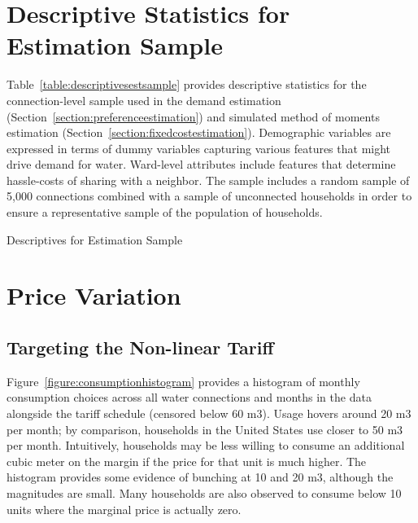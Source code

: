 \documentclass[12pt]{article}
\begin{document}
\begin{appendices}
\section{Descriptive Statistics for Estimation Sample}\label{appendix:descriptivesest}

Table~\ref{table:descriptivesestsample} provides descriptive statistics for the connection-level sample used in the demand estimation (Section~\ref{section:preferenceestimation}) and simulated method of moments estimation (Section~\ref{section:fixedcostestimation}).  Demographic variables are expressed in terms of dummy variables capturing various features that might drive demand for water.  Ward-level attributes include features that determine hassle-costs of sharing with a neighbor.  The sample includes a random sample of 5,000 connections combined with a sample of unconnected households in order to ensure a representative sample of the population of households.

\begin{table}
\caption{Descriptives for Estimation Sample}\label{table:descriptivesestsample}
\begin{center}

\end{center}
\end{table}



\section{Price Variation}\label{appendix:pricevariation}

\subsection{Targeting the Non-linear Tariff}

Figure~\ref{figure:consumptionhistogram} provides a histogram of monthly consumption choices across all water connections and months in the data alongside the tariff schedule (censored below 60 m3).  Usage hovers around 20 m3 per month; by comparison, households in the United States use closer to 50 m3 per month.  Intuitively, households may be less willing to consume an additional cubic meter on the margin if the price for that unit is much higher.  The histogram provides some evidence of bunching at 10 and 20 m3, although the magnitudes are small.  Many households are also observed to consume below 10 units where the marginal price is actually zero.  


\end{appendices}
\end{document}

